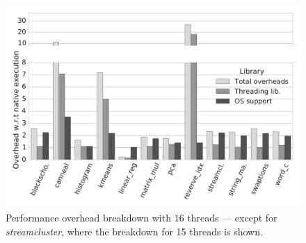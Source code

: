 
\begin{figure}[t]
\centering
\includegraphics[scale=0.25]{figure/benchmarks/times-16-threads.pdf}
\caption{Performance overhead breakdown with $16$ threads --- except for {\em streamcluster}, where the breakdown for 15 threads is shown.}
\label{fig:overheads-breakdown}
\end{figure}
